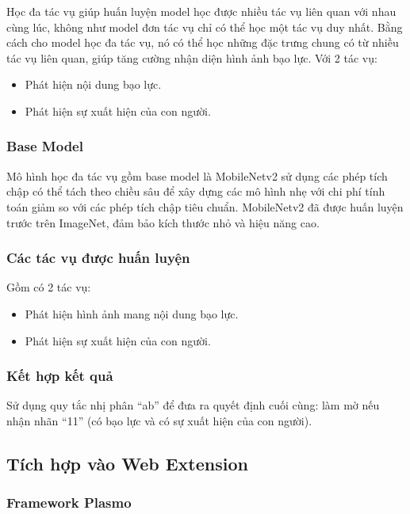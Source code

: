 \documentclass[12pt,a4paper]{article}
\begin{document}
Học đa tác vụ giúp huấn luyện model học được nhiều tác vụ liên quan với nhau cùng lúc, không như model đơn tác vụ chỉ có thể học một tác vụ duy nhất. Bằng cách cho model học đa tác vụ, nó có thể học những đặc trưng chung có từ nhiều tác vụ liên quan, giúp tăng cường nhận diện hình ảnh bạo lực. Với 2 tác vụ:

\begin{itemize}
  \item Phát hiện nội dung bạo lực.
  \item Phát hiện sự xuất hiện của con người.
\end{itemize}

\subsubsection{Base Model} 

Mô hình học đa tác vụ gồm base model là MobileNetv2 sử dụng các phép tích chập có thể tách theo chiều sâu để xây dựng các mô hình nhẹ với chi phí tính toán giảm so với các phép tích chập tiêu chuẩn. MobileNetv2 đã được huấn luyện trước trên ImageNet, đảm bảo kích thước nhỏ và hiệu năng cao.

\subsubsection{Các tác vụ được huấn luyện}

Gồm có 2 tác vụ:
\begin{itemize}
  \item Phát hiện hình ảnh mang nội dung bạo lực.
  \item Phát hiện sự xuất hiện của con người.
\end{itemize}

\subsubsection{Kết hợp kết quả} 

Sử dụng quy tắc nhị phân ``ab'' để đưa ra quyết định cuối cùng: làm mờ nếu nhận nhãn ``11'' (có bạo lực và có sự xuất hiện của con người).

\subsection{Tích hợp vào Web Extension}

\subsubsection{Framework Plasmo}
\end{document}
